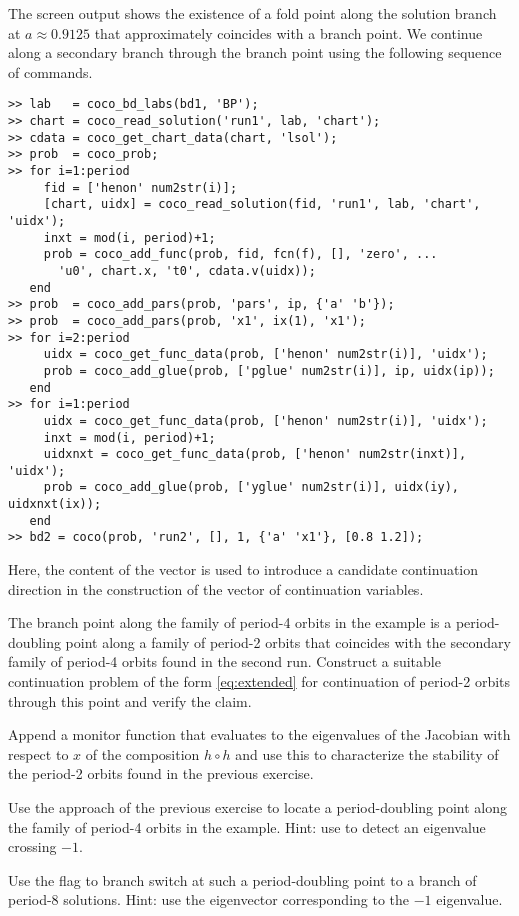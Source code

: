 The screen output shows the existence of a fold point along the solution branch at $a\approx 0.9125$ that approximately coincides with a branch point. We continue along a secondary branch through the branch point using the following sequence of commands.
\begin{lstlisting}[language=coco-highlight]
>> lab   = coco_bd_labs(bd1, 'BP');
>> chart = coco_read_solution('run1', lab, 'chart');
>> cdata = coco_get_chart_data(chart, 'lsol');
>> prob  = coco_prob;
>> for i=1:period
     fid = ['henon' num2str(i)];
     [chart, uidx] = coco_read_solution(fid, 'run1', lab, 'chart', 'uidx');
     inxt = mod(i, period)+1;
     prob = coco_add_func(prob, fid, fcn(f), [], 'zero', ...
       'u0', chart.x, 't0', cdata.v(uidx));
   end
>> prob  = coco_add_pars(prob, 'pars', ip, {'a' 'b'});
>> prob  = coco_add_pars(prob, 'x1', ix(1), 'x1');
>> for i=2:period
     uidx = coco_get_func_data(prob, ['henon' num2str(i)], 'uidx');
     prob = coco_add_glue(prob, ['pglue' num2str(i)], ip, uidx(ip));
   end
>> for i=1:period
     uidx = coco_get_func_data(prob, ['henon' num2str(i)], 'uidx');
     inxt = mod(i, period)+1;
     uidxnxt = coco_get_func_data(prob, ['henon' num2str(inxt)], 'uidx');
     prob = coco_add_glue(prob, ['yglue' num2str(i)], uidx(iy), uidxnxt(ix));
   end
>> bd2 = coco(prob, 'run2', [], 1, {'a' 'x1'}, [0.8 1.2]);
\end{lstlisting}
Here, the content of the  vector is used to introduce a candidate continuation direction in the construction of the vector of continuation variables.

\begin{exercises}
\item The branch point along the family of period-4 orbits in the example is a period-doubling point along a family of period-2 orbits that coincides with the secondary family of period-4 orbits found in the second run. Construct a suitable continuation problem of the form \eqref{eq:extended} for continuation of period-2 orbits through this point and verify the claim.
\item Append a monitor function that evaluates to the eigenvalues of the Jacobian with respect to $x$ of the composition $h\circ h$ and use this to characterize the stability of the period-2 orbits found in the previous exercise.
\item Use the approach of the previous exercise to locate a period-doubling point along the family of period-4 orbits in the example. Hint: use  to detect an eigenvalue crossing $-1$.
\item Use the  flag to branch switch at such a period-doubling point to a branch of period-8 solutions. Hint: use the eigenvector corresponding to the $-1$ eigenvalue.
\end{exercises}

